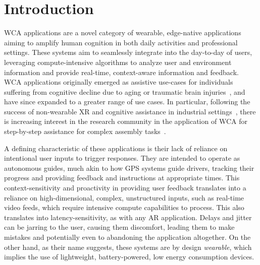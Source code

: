\section{Introduction}\label{sec:intro}

\acf{WCA} applications are a novel category of wearable, edge-native applications aiming to amplify human cognition in both daily activities and professional settings.
These systems aim to seamlessly integrate into the day-to-day of users, leveraging compute-intensive algorithms to analyze user and environment information and provide real-time, context-aware information and feedback.
\ac{WCA} applications originally emerged as assistive use-cases for individuals suffering from cognitive decline due to aging or traumatic brain injuries~\cite{satyanarayanan2009case,Ha2014towards,Satya2019augmenting}, and have since expanded to a greater range of use cases.
In particular, following the success of non-wearable \ac{XR} and cognitive assistance in industrial settings~\cite{Funk2015Cognitive,Wang2022Comprehensive}, there is increasing interest in the research community in the application of \ac{WCA} for step-by-step assistance for complex assembly tasks~\cite{Chen2017Empirical,belletier2021wearable}.

A defining characteristic of these applications is their lack of reliance on intentional user inputs to trigger responses.
They are intended to operate as autonomous guides, much akin to how \ac{GPS} systems guide drivers, tracking their progress and providing feedback and instructions at appropriate times.
This context-sensitivity and proactivity in providing user feedback translates into a reliance on high-dimensional, complex, unstructured inputs, such as real-time video feeds, which require intensive compute capabilities to process.
This also translates into latency-sensitivity, as with any \ac{AR} application.
Delays and jitter can be jarring to the user, causing them discomfort, leading them to make mistakes and potentially even to abandoning the application altogether.
On the other hand, as their name suggests, these systems are by design \emph{wearable}, which implies the use of lightweight, battery-powered, low energy consumption devices.

